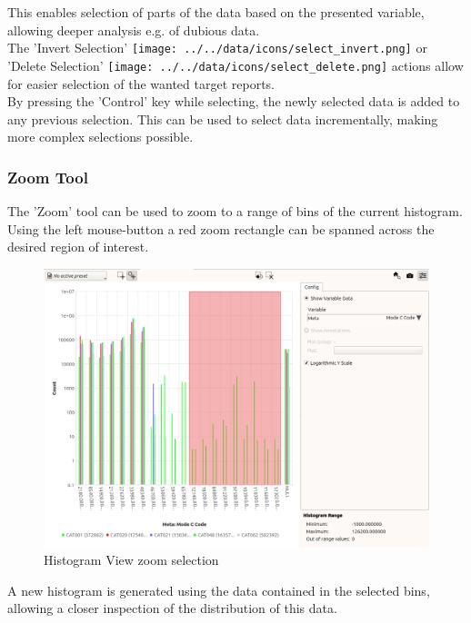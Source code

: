 This enables selection of parts of the data based on the presented variable, allowing deeper analysis e.g. of dubious data. \\

The 'Invert Selection' \texttt{[image: ../../data/icons/select\_invert.png]} or 'Delete Selection' \texttt{[image: ../../data/icons/select\_delete.png]} actions allow for easier selection of the wanted target reports. \\

By pressing the 'Control' key while selecting, the newly selected data is added to any previous selection. This can be used to select data incrementally, making more complex selections possible.

\subsubsection{Zoom Tool}

The 'Zoom' tool can be used to zoom to a range of bins of the current histogram. Using the left mouse-button a red zoom rectangle can be spanned across the desired region of interest.

\begin{figure}[H]
    \hspace*{-2cm}
    \includegraphics[width=18cm,frame]{figures/histogram_zoom.png}
  \caption{Histogram View zoom selection} 
\end{figure}

A new histogram is generated using the data contained in the selected bins, allowing a closer inspection of the distribution of this data.

